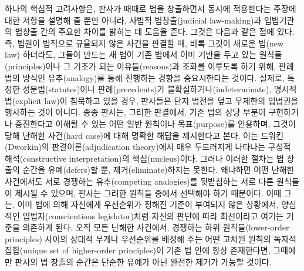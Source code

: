 하나의 핵심적 고려사항은, 판사가 때때로 법을 창출하면서 동시에
적용한다는 주장에 대한 저항을 설명해 줄 뿐만 아니라, 사법적
법창출(judicial law-making)과 입법기관의 법창출 간의 주요한 차이를
밝히는 데 도움을 준다. 그것은 다음과 같은 점에 있다. 즉, 법원이 법적으로
규율되지 않은 사건을 판결할 때, 비록 그것이 새로운 법(new
law) 하더라도, 그들이 만드는 새 법이 기존 법에서 이미
기반을 두고 있는 원칙들(principles)이나 그 기초가 되는 이유들(reasons)과
조화를 이루도록 하기 위해, 판례법의 방식인 유추(analogy)를 통해 진행하는
경향을 중요시한다는 것이다. 실제로, 특정한 성문법(statutes)이나
판례(precedents)가 불확실하거나(indeterminate), 명시적 법(explicit
law)이 침묵하고 있을 경우, 판사들은 단지 법전을 덮고 무제한의 입법권을
행사하는 것이 아니다. 종종 판사는, 그러한 판결에서, 기존 법의 상당
부분이 구현하거나 증진한다고 이해될 수 있는 어떤 일반 원칙이나
목표(purpose)를 인용하며, 그것이 당해 난해한 사건(hard case)에 대해
명확한 해답을 제시한다고 본다. 이는 드워킨(Dworkin)의
판결이론(adjudication theory)에서 매우 두드러지게 나타나는 구성적
해석(constructive interpretation)의 핵심(nucleus)이다. 그러나 이러한
절차는 법 창출의 순간을 유예(defers)할 뿐, 제거(eliminate)하지는 못한다.
왜냐하면 어떤 난해한 사건에서도 서로 경쟁하는 유추(competing
analogies)를 뒷받침하는 서로 다른 원칙들이 제시될 수 있으며, 판사는
그러한 원칙들 중에서 선택해야 하기 때문이다. 이때 그는, 이미 법에 의해
자신에게 우선순위가 정해진 기준이 부여되지 않은 상황에서, 양심적인
입법자(conscientious legislator)처럼 자신의 판단에 따라 최선이라고
여기는 기준을 의존하게 된다. 오직 모든 난해한 사건에서, 경쟁하는 하위
원칙들(lower-order principles) 사이의 상대적 무게나 우선순위를 배정해
주는 어떤 고차원 원칙의 독자적 집합(unique set of higher-order
principles)이 기존 법 안에 항상 존재한다면, 그때에만 판사의 법 창출의
순간은 단순한 유예가 아닌 완전한 제거가 가능할 것이다.

